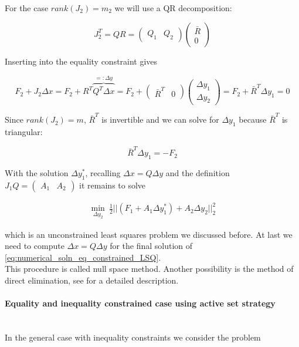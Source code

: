 \documentclass{scrartcl}[12pt, halfparskip]
\numberwithin{equation}{section}
\numberwithin{figure}{section}
\numberwithin{table}{section}
\begin{document}
For the case $rank(J_2)=m_2$ we will use a QR decomposition:

\begin{equation}
	J_2^T = Q R = 
	\begin{pmatrix}
		Q_1 & Q_2
	\end{pmatrix}
	\begin{pmatrix}
		\bar{R} \\
		0
	\end{pmatrix}
\end{equation}

Inserting into the equality constraint gives

\begin{equation}
	F_2 + J_2 \Delta x = F_2 + R^T \overbrace{Q^T \Delta x}^{=: \Delta y} = F_2 +
	\begin{pmatrix}
		\bar{R}^T & 0
	\end{pmatrix} 
	\begin{pmatrix}
		\Delta y_1 \\
		\Delta y_2
	\end{pmatrix} = F_2 + \bar{R}^T \Delta y_1 = 0
\end{equation}

Since $rank(J_2)=m$, $\bar{R}^T$ is invertible and we can solve for $\Delta y_1$ because $\bar{R}^T$ is triangular:

\begin{equation}
	\bar{R}^T \Delta y_1 = -F_2
\end{equation}

With the solution $\Delta y_1^*$, recalling $\Delta x = Q \Delta y$ and the definition $J_1 Q = \begin{pmatrix} A_1 & A_2 \end{pmatrix}$ it remains to solve

\begin{align}
	\min_{\Delta y_2} \ \frac{1}{2} || (F_1 + A_1 \Delta y_1^*) + A_2 \Delta y_2 ||_2^2
\end{align}

which is an unconstrained least squares problem we discussed before. At last we need to compute $\Delta x = Q \Delta y$ for the final solution of \eqref{eq:numerical_soln_eq_constrained_LSQ}. \\
This procedure is called null space method. Another possibility is the method of direct elimination, see \cite{numerical_methods_lsq_Bjorck} for a detailed description.


\paragraph{Equality and inequality constrained case using active set strategy}\mbox{}\\
In the general case with inequality constraints we consider the problem
\end{document}
